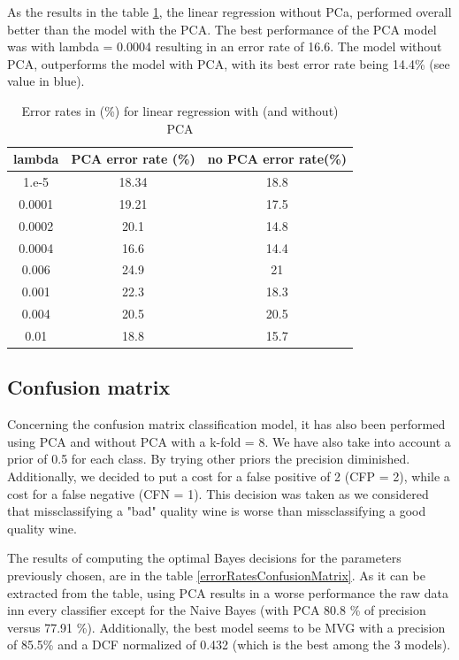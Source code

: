 \documentclass[twoside,a4paper,12pt]{report}
\begin{document}
As the results in the table \ref{errorRateslinearregression}, the linear regression
without PCa, performed overall better than the model with the PCA.
The best performance of the PCA model was with lambda = 0.0004 
resulting in an error rate of 16.6. The model without PCA, outperforms the model 
with PCA, with its best error rate being 14.4\% (see value in blue).

\begin{table}
    \centering
     \begin{tabular}{||c c c ||} 
        \hline \hline
        lambda & PCA error rate (\%) & no PCA error rate(\%)\\
        \hline\hline
        1.e-5  & 18.34  & 18.8   \\ 
        \hline
        0.0001 & 19.21  &  17.5  \\ 
        \hline
        0.0002 & 20.1  &  14.8  \\ 
        \hline
        0.0004 & 16.6  &  \cellcolor{blue!25}  14.4  \\ 
        \hline
        0.006  & 24.9  & 21    \\ 
        \hline
        0.001  & 22.3  &  18.3  \\ 
        \hline
        0.004 & 20.5  &  20.5  \\ 
        \hline
        0.01  &  18.8 & 15.7   \\ 
        \hline \hline
    \end{tabular}
    \caption{Error rates in (\%) for linear regression with (and without) PCA     \label{errorRateslinearregression}
    }
    \end{table}


\subsection{Confusion matrix}
Concerning the confusion matrix classification model, it has also been performed 
using PCA and without PCA with a k-fold = 8.
We have also take into account a prior of 0.5 for each class. By trying other priors
the precision diminished. 
Additionally, we decided to put a cost for a false positive of 2 (CFP = 2), while a cost
for a false negative (CFN = 1). This decision was taken as we considered
that missclassifying a "bad" quality wine is worse than missclassifying a 
good quality wine.


The results of computing the optimal Bayes decisions for the parameters previously chosen,
are in the table \ref{errorRatesConfusionMatrix}. As it can be extracted from the table,
using PCA results in a worse performance the raw data inn every classifier except for the
Naive Bayes (with PCA 80.8 \% of precision versus 77.91 \%). 
Additionally, the best model seems to be MVG with a precision of 85.5\% and a DCF normalized
of 0.432 (which is the best among the 3 models).
\end{document}
